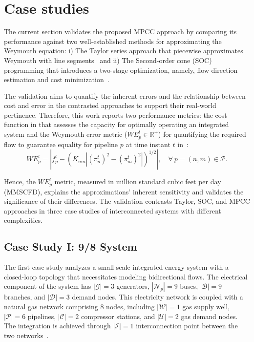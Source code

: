 \section{Case studies} \label{sec:case_study}
The current section validates the proposed MPCC approach by comparing its performance against two well-established methods for approximating the Weymouth equation: i) The Taylor series approach that piecewise approximates Weymouth with line segments~\cite{ORDOUDIS2019642} and ii) The Second-order cone (SOC) programming that introduces a two-stage optimization, namely, flow direction estimation and cost minimization~\cite{soc_paper}. 

The validation aims to quantify the inherent errors and the relationship between cost and error in the contrasted approaches to support their real-world pertinence. Therefore, this work reports two performance metrics: the cost function in  that assesses the capacity for optimally operating an integrated system and the Weymouth error metric (${WE}_p^t\in\mathbb{R}^+$) for quantifying the required flow to guarantee equality for pipeline $p$ at time instant $t$ in~:
\begin{equation}
    {WE}_p^t = \left|f_{p}^t - \left(K_{nm}|(\pi_{n}^t)^2-(\pi_{m}^t)^2|\right)^{1/2}\right| , \quad \forall \ p =(n,m) \in\mathcal{P}.
    \label{eq:weymouth_cons}
\end{equation}

\noindent Hence, the ${WE}_p^t$ metric, measured in million standard cubic feet per day (MMSCFD), explains the approximations' inherent sensitivity and validates the significance of their differences. The validation contrasts Taylor, SOC, and MPCC approaches in three case studies of interconnected systems with different complexities.

\subsection{Case Study I: 9/8 System}


The first case study analyzes a small-scale integrated energy system with a closed-loop topology that necessitates modeling bidirectional flows. The electrical component of the system has $\left| \mathcal{G} \right| = 3$ generators, $\left| \mathcal{N}_p \right| = 9$ buses, $\left| \mathcal{B} \right| = 9$ branches, and $\left| \mathcal{D} \right| = 3$ demand nodes. This electricity network is coupled with a natural gas network comprising 8 nodes, including $\left| \mathcal{W} \right| = 1$ gas supply well, $\left| \mathcal{P} \right| = 6$ pipelines, $\left| \mathcal{C} \right| = 2$ compressor stations, and $\left| \mathcal{U} \right| = 2$ gas demand nodes. The integration is achieved through $\left| \mathcal{I} \right| = 1$ interconnection point between the two networks~\citep{Wilson_poly}. 


